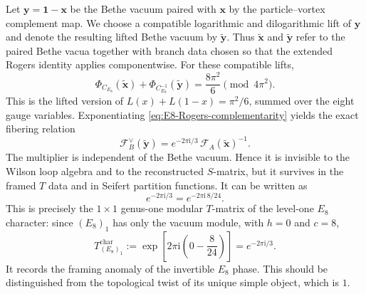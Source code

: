 \documentclass[11pt,a4paper]{article}
\numberwithin{equation}{section}
\begin{document}
Let $\boldsymbol y=\boldsymbol1-\boldsymbol x$ be the Bethe vacuum paired with $\boldsymbol x$ by the particle--vortex complement map.  We choose a compatible logarithmic and dilogarithmic lift of $\boldsymbol y$ and denote the resulting lifted Bethe vacuum by $\widetilde{\boldsymbol y}$.  Thus $\widetilde{\boldsymbol x}$ and $\widetilde{\boldsymbol y}$ refer to the paired Bethe vacua together with branch data chosen so that the extended Rogers identity applies componentwise.  For these compatible lifts,
\begin{equation}
  \Phi_{C_{E_8}}(\widetilde{\boldsymbol x})
  +
  \Phi_{C_{E_8}^{-1}}(\widetilde{\boldsymbol y})
  =
  \frac{8\pi^2}{6}
  \pmod{4\pi^2}.
  \label{eq:E8-Rogers-complementarity}
\end{equation}
This is the lifted version of $L(x)+L(1-x)=\pi^2/6$, summed over the eight gauge variables.  Exponentiating \eqref{eq:E8-Rogers-complementarity} yields the exact fibering relation
\begin{equation}
  \mathcal F_B^\vee(\widetilde{\boldsymbol y})
  =
  e^{-2\pi \mathrm{i}/3}\,
  \mathcal F_A(\widetilde{\boldsymbol x})^{-1}.
  \label{eq:E8-fibering-complementarity}
\end{equation}
The multiplier is independent of the Bethe vacuum.  Hence it is invisible to the Wilson loop algebra and to the reconstructed $S$-matrix, but it survives in the framed $T$ data and in Seifert partition functions.  It can be written as
\begin{equation}
  e^{-2\pi \mathrm{i}/3}
  =e^{-2\pi \mathrm{i}\,8/24}.
  \label{eq:E8-framing-phase}
\end{equation}
This is precisely the $1\times1$ genus-one modular $T$-matrix of the level-one $E_8$ character: since $(E_8)_1$ has only the vacuum module, with $h=0$ and $c=8$,
\begin{equation}
  T_{(E_8)_1}^{\mathrm{char}}
  :=\exp\!\left[2\pi\mathrm{i}\left(0-\frac{8}{24}\right)\right]
  =e^{-2\pi \mathrm{i}/3}.
  \label{eq:E8-character-T-multiplier}
\end{equation}
It records the framing anomaly of the invertible $E_8$ phase.  This should be distinguished from the topological twist of its unique simple object, which is $1$.
\end{document}
